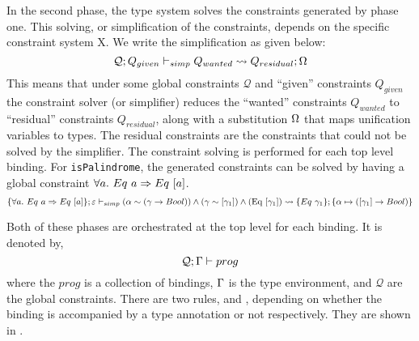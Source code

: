 \documentclass[manuscript,screen,nonacm]{acmart}
\begin{document}
\newcommand\SolConstraints[5]{\ensuremath{#1 ; #2 \vdash_{simp} #3 \rightsquigarrow #4 ; #5}}
In the second phase, the type system solves the constraints generated by phase one. This solving, or simplification of the constraints, depends on the specific constraint system X. We write the simplification as given below:
$$
\SolConstraints {\mathcal Q} {Q_{given}} {Q_{wanted}} {Q_{residual}} \Subst
$$
This means that under some global constraints $\mathcal{Q}$ and ``given'' constraints $Q_{given}$ the constraint solver (or simplifier) reduces the ``wanted'' constraints $Q_{wanted}$ to ``residual'' constraints $Q_{residual}$, along with a substitution $\Omega$ that maps unification variables to types. The residual constraints are the constraints that could not be solved by the simplifier. The constraint solving is performed for each top level binding. For \lstinline{isPalindrome}, the generated constraints can be solved
by having a global constraint $\forall a.~ Eq~ a \Rightarrow Eq~ [a]$.
$$
\SolConstraints {\Set{\forall a.~ Eq~ a \then Eq~ [a]}} {\varepsilon} {(\TyVar \sim (\Co \to Bool)) \land (\Co \sim [\Co_1]) \land (\text{\lstinline{Eq}}~ [\Co_1])} {\Set{Eq~\Co_1}} {\Set{\TyVar \mapsto ([\Co_1] \to Bool)}}
$$

\newcommand\TopLevel[3]{\ensuremath{#1 ; #2 \vdash #3}}
Both of these phases are orchestrated at the top level for each binding. It is denoted by,
$$
\TopLevel {\mathcal{Q}} \TEnv {prog}
$$
where the $prog$ is a collection of bindings, $\Gamma$ is the type environment, and $\mathcal Q$ are the global constraints. There are two rules,  and , depending on whether the binding is accompanied by a type annotation or not respectively. They are shown in .
\end{document}
